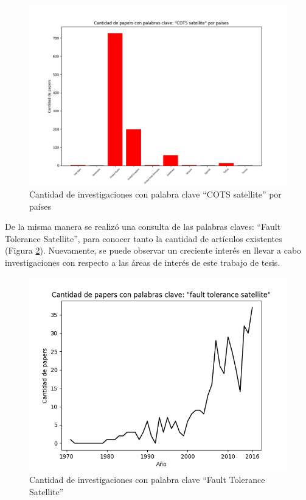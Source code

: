 \begin{figure}[h!]
 \centering
 \includegraphics[scale=0.6]{images/Secciones/antecedentes/Cantidad_paper-COTS-Satellite-Country.png}
  \caption{Cantidad de investigaciones con palabra clave ``COTS satellite'' por países}
\label{fig:ant2}
\end{figure}

De la misma manera se realizó una consulta de las palabras claves: ``Fault Tolerance Satellite'',
para conocer tanto la cantidad de artículos existentes (Figura \ref{fig:ant3}). Nuevamente, se puede
observar un creciente interés en llevar a cabo investigaciones con respecto a las áreas de interés
de este trabajo de tesis. 

\begin{figure}[h!]
 \centering
 \includegraphics[scale=0.8]{images/Secciones/antecedentes/Cantidad_paper-fault_tolerance_satellite.png}
  \caption{Cantidad de investigaciones con palabra clave ``Fault Tolerance Satellite''}
\label{fig:ant3}
\end{figure}


